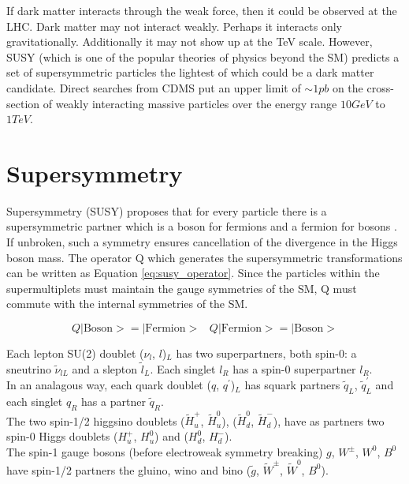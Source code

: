 If dark matter interacts through the weak force, then it could be observed at
the LHC. Dark matter may not interact weakly. Perhaps it interacts only 
gravitationally. Additionally it may not show up at the TeV scale. However, 
SUSY (which is one of the popular theories of physics beyond the SM) 
predicts a set of supersymmetric particles the lightest of which could be a 
dark matter candidate. Direct searches from CDMS \cite{cdms} put an upper limit 
of $\sim 1\unit{pb}$ on the cross-section of weakly interacting massive 
particles over the energy range $10\unit{GeV}$ to $1\unit{TeV}$.

\section{Supersymmetry}

Supersymmetry (SUSY) proposes that for every particle there is a supersymmetric 
partner which is a boson for fermions and a fermion for bosons \cite{primer}. 
If unbroken, such a symmetry ensures cancellation of the divergence in the Higgs 
boson mass. The operator Q which generates the supersymmetric transformations 
can be written as Equation \ref{eq:susy_operator}. Since the particles within 
the supermultiplets must maintain the gauge symmetries of the SM, Q must 
commute with the internal symmetries of the SM.

\begin{equation}
Q|\mbox{Boson}> = |\mbox{Fermion}> \hspace{10pt} Q|\mbox{Fermion}> = |\mbox{Boson}>
\label{eq:susy_operator}
\end{equation}

Each lepton SU(2) doublet ($\nu_{l}$, $l$)$_{L}$ has two superpartners, both spin-0:
a sneutrino $\tilde{\nu}_{lL}$ and a slepton $\tilde{l}_{L}$. Each singlet
$l_{R}$ has a spin-0 superpartner $l_{R}$. \\

In an analagous way, each quark doublet ($q$, $q^{\prime}$)$_{L}$ has squark partners
$\tilde{q}_{L}$, $\tilde{q}^{\prime}_{L}$ and each singlet $q_{R}$ has a partner
$\tilde{q}_{R}$. \\

The two spin-1/2 higgsino doublets ($\tilde{H}_{u}^{+}$, $\tilde{H}_{u}^{0}$),
($\tilde{H}_{d}^{0}$, $\tilde{H}_{d}^{-}$), have as partners two spin-0 Higgs
doublets ($H_{u}^{+}$, $H_{u}^{0}$) and ($H_{d}^{0}$, $H_{d}^{-}$). \\

The spin-1 gauge bosons (before electroweak symmetry breaking) $g$, $W^{\pm}$,
$W^{0}$, $B^{0}$ have spin-1/2 partners the gluino, wino and bino ($\tilde{g}$,
$\tilde{W}^{\pm}$, $\tilde{W}^{0}$, $B^{0}$). \\

